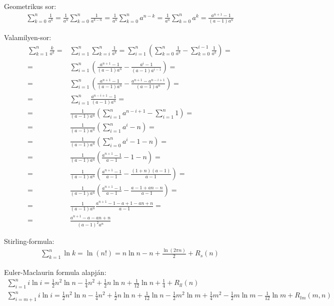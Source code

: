 \documentclass{article}
\begin{document}
Geometrikus sor:
\begin{align*}
\sum_{k=0}^{n} \frac{1}{a^k}
= \frac{1}{a^n} \sum_{k=0}^{n} \frac{1}{a^{k-n}}
= \frac{1}{a^n} \sum_{k=0}^{n} a^{n-k}
= \frac{1}{a^n} \sum_{k=0}^{n} a^k
= \frac{a^{n+1}-1}{(a-1)a^n}
\end{align*}

Valamilyen-sor:
\begin{align*}
\sum_{k=1}^{n} \frac{k}{a^k}
=& \sum_{i=1}^{n} \sum_{k=i}^{n} \frac{1}{a^k}
= \sum_{i=1}^{n} \left( \sum_{k=0}^{n} \frac{1}{a^k} - \sum_{k=0}^{i-1} \frac{1}{a^k} \right) = \\
=& \sum_{i=1}^{n} \left( \frac{a^{n+1}-1}{(a-1)a^n} - \frac{a^{i}-1}{(a-1)a^{i-1}} \right) = \\
=& \sum_{i=1}^{n} \left( \frac{a^{n+1}-1}{(a-1)a^n} - \frac{a^{n+1}-a^{n-i+1}}{(a-1)a^{n}} \right) = \\
=& \sum_{i=1}^{n} \frac{a^{n-i+1}-1}{(a-1)a^n} = \\
=& \frac{1}{(a-1)a^n} \left( \sum_{i=1}^{n} a^{n-i+1} - \sum_{i=1}^{n} 1 \right) = \\
=& \frac{1}{(a-1)a^n} \left( \sum_{i=1}^{n} a^{i} - n \right) = \\
=& \frac{1}{(a-1)a^n} \left( \sum_{i=0}^{n} a^{i} - 1 - n \right) = \\
=& \frac{1}{(a-1)a^n} \left( \frac{a^{n+1}-1}{a-1} - 1 - n \right) = \\
=& \frac{1}{(a-1)a^n} \left( \frac{a^{n+1}-1}{a-1} - \frac{(1 + n)(a-1)}{a-1} \right) = \\
=& \frac{1}{(a-1)a^n} \left( \frac{a^{n+1}-1}{a-1} - \frac{a -1 +an -n}{a-1} \right) = \\
=& \frac{1}{(a-1)a^n} \frac{a^{n+1}-1-a+1-an+n}{a-1} = \\
=& \frac{a^{n+1} - a - a n + n}{(a-1)^2 a^n}
\end{align*}

Stirling-formula:
\begin{align*}
\sum_{k=1}^{n} \ln{k} = \ln{(n!)} = n \ln{n} - n + \frac{\ln{(2 \pi n)}}{2} + R_s(n)
\end{align*}

Euler-Maclaurin formula alapján:
\begin{align*}
\sum_{i=1}^{n} i \ln{i} = \frac{1}{2} n^2 \ln{n} - \frac{1}{4} n^2 + \frac{1}{2} n \ln{n} + \frac{1}{12} \ln{n} + \frac{1}{4} + R_{ll}(n) \\
\sum_{i=m+1}^{n} i \ln{i} = \frac{1}{2} n^2 \ln{n} - \frac{1}{4} n^2 + \frac{1}{2} n \ln{n} + \frac{1}{12} \ln{n} - \frac{1}{2} m^2 \ln{m} + \frac{1}{4} m^2 - \frac{1}{2} m \ln{m} - \frac{1}{12} \ln{m} + R_{lm}(m, n)
\end{align*}
\end{document}
